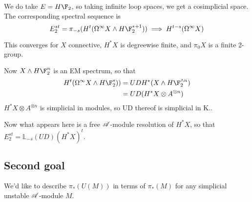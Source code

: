 \begin{RuneBabytop}
We do take $E=H\F_2$, so taking infinite loop spaces, we get a cosimplicial space. The corresponding spectral sequence is
\[E_2^{st}=\pi_{-s}(H^t(\Omega^\infty X\wedge H\F_2^{*+1}))\implies H^{t-s}(\Omega^\infty X)\]
\begin{thm*}[Bousfield]
This converges for $X$ connective, $H^*X$ is degreewise finite, and $\pi_0X$ is a finite 2-group.
\end{thm*}
Now $X\wedge H\F_2^n$ is an EM spectrum, so that 
\begin{alignat*}{2}
H^t(\Omega^\infty X\wedge H\F_2^{*}))&=UDH^*(X\wedge H\F_2^{\wedge n})%
\\&=UD(H^*X\otimes A^{\otimes n})%
\end{alignat*}
$H^*X\otimes A^{\otimes n}$ is simplicial in modules, so UD thereof is simplicial in K..

Now what appears here is a free $\mathscr{A}$-module resolution of $H^*X$, so that $E_2^{st}=\mathbb{L}_{-s}(UD)(H^*X)^t$.
\subsection*{Second goal}
We'd like to describe $\pi_*(U(M))$ in terms of $\pi_*(M)$ for any simplicial unstable $\mathscr{A}$-module $M$.


\end{RuneBabytop}
